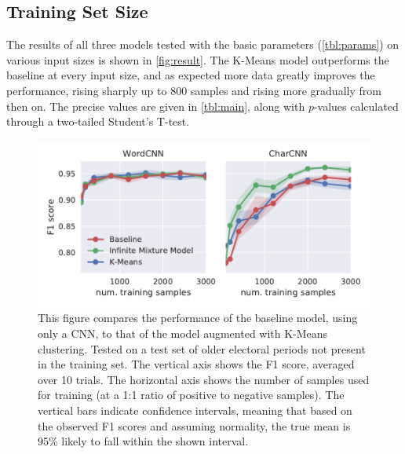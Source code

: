 \subsection{Training Set Size}
The results of all three models tested with the basic parameters
(\cref{tbl:params}) on various input sizes is shown in \cref{fig:result}. The
K-Means model outperforms the baseline at every input size, and as expected more
data greatly improves the performance, rising sharply up to 800 samples and
rising more gradually from then on. The precise values are given in
\cref{tbl:main}, along with $p$-values calculated through a two-tailed Student's
T-test.
\begin{figure}[tb]
  \centering
  \includegraphics[width=\textwidth]{figures/results/training-size-old/tseries_f1.pdf}
  \caption{This figure compares the performance of the baseline model, using
    only a CNN, to that of the model augmented with K-Means clustering.  Tested
    on a test set of older electoral periods not present in the training set.
    The vertical axis shows the F1 score, averaged over 10 trials. The
    horizontal axis shows the number of samples used for training (at a 1:1
    ratio of positive to negative samples). The vertical bars indicate
    confidence intervals, meaning that based on the observed F1 scores and
    assuming normality, the true mean is 95\% likely to fall within the shown
  interval.\label{fig:result_old}}
\end{figure}

